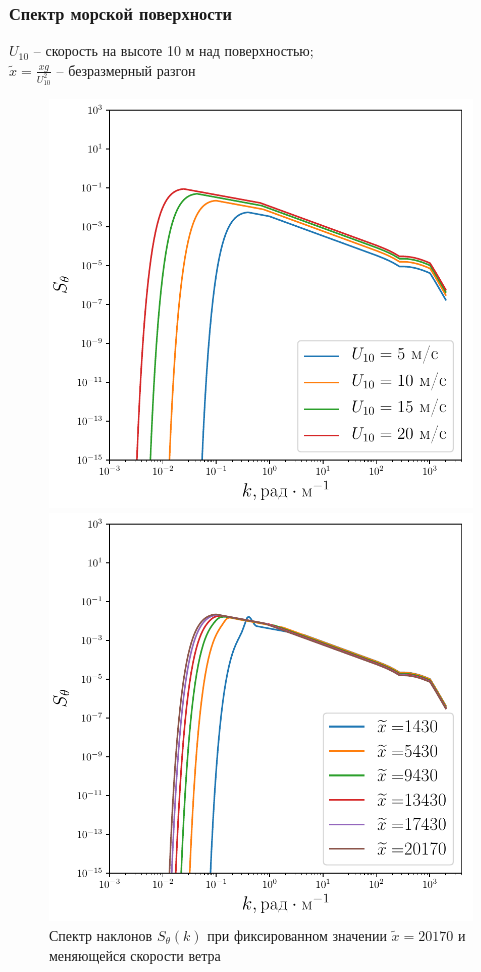 \documentclass[10pt,pdf,hyperref={unicode}, dvipsnames]{beamer}
\begin{document}
\begin{frame}[t]
	\frametitle{Спектр морской поверхности}
	$U_{10}$ -- скорость на высоте 10 м над поверхностью; \\
	$\tilde x = \frac{x g}{U^2_{10}}$ -- безразмерный разгон
    \begin{figure}[h!]
	\begin{minipage}{0.49\linewidth}
			\centering
			\includegraphics[width=\linewidth]{fig/full_spectrum3.pdf}
			\caption{Спектр наклонов $S_{\theta}(k)$ при фиксированном значении $\tilde x=20170$ и меняющейся скорости ветра}		
			\label{fig:full_spectrum3}
	\end{minipage}
	\hfill
	\begin{minipage}{0.49\linewidth}
			\centering
			\includegraphics[width=\linewidth]{fig/full_spectrum4.pdf}

\end{minipage}
\end{figure}
\end{frame}
\end{document}
